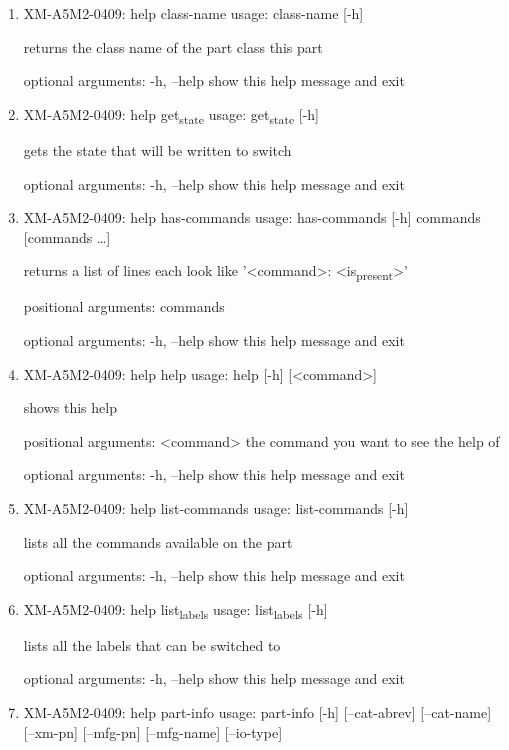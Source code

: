 \documentclass[11pt]{article}
\begin{document}
\begin{enumerate}
\item XM-A5M2-0409: help class-name
\label{sec:org9ffcf7f}
usage: class-name [-h]

returns the class name of the part class this part

optional arguments:
  -h, --help  show this help message and exit

\item XM-A5M2-0409: help get\textsubscript{state}
\label{sec:org655154d}
usage: get\textsubscript{state} [-h]

gets the state that will be written to switch

optional arguments:
  -h, --help  show this help message and exit

\item XM-A5M2-0409: help has-commands
\label{sec:org29253fb}
usage: has-commands [-h] commands [commands \ldots{}]

returns a list of lines each look like '<command>: <is\textsubscript{present}>'

positional arguments:
  commands

optional arguments:
  -h, --help  show this help message and exit

\item XM-A5M2-0409: help help
\label{sec:org9012a65}
usage: help [-h] [<command>]

shows this help

positional arguments:
  <command>   the command you want to see the help of

optional arguments:
  -h, --help  show this help message and exit

\item XM-A5M2-0409: help list-commands
\label{sec:org07dbd05}
usage: list-commands [-h]

lists all the commands available on the part

optional arguments:
  -h, --help  show this help message and exit

\item XM-A5M2-0409: help list\textsubscript{labels}
\label{sec:org0ed5c30}
usage: list\textsubscript{labels} [-h]

lists all the labels that can be switched to

optional arguments:
  -h, --help  show this help message and exit

\item XM-A5M2-0409: help part-info
\label{sec:org56b386e}
usage: part-info  [-h] [--cat-abrev] [--cat-name] [--xm-pn] [--mfg-pn] [--mfg-name]
        [--io-type]


\end{enumerate}
\end{document}

